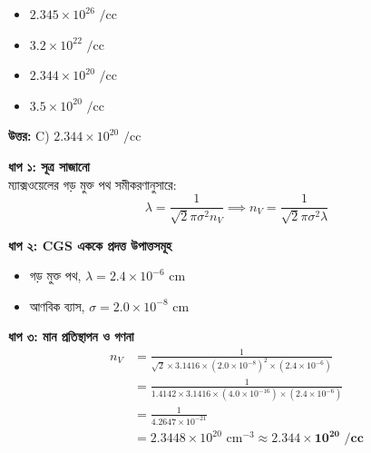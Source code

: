 \documentclass[12pt, a4paper]{article}
\begin{document}
\begin{itemize}[label={}, leftmargin=1cm, itemsep=0.5em]
    \item[\textbf{A)}] $2.345 \times 10^{26}\text{ /cc}$
    \item[\textbf{B)}] $3.2 \times 10^{22}\text{ /cc}$
    \item[\textbf{C)}] $2.344 \times 10^{20}\text{ /cc}$
    \item[\textbf{D)}] $3.5 \times 10^{20}\text{ /cc}$
\end{itemize}

\vspace{0.5em}
\begin{tcolorbox}[answerbox]
    \textbf{\color{success} উত্তর:} C) $2.344 \times 10^{20}\text{ /cc}$
\end{tcolorbox}
\vspace{1em}

\begin{tcolorbox}[solutionbox={সমাধান (Solution)}]
    \noindent
    \textbf{ধাপ ১: সূত্র সাজানো} \\
    ম্যাক্সওয়েলের গড় মুক্ত পথ সমীকরণানুসারে:
    \[ \lambda = \frac{1}{\sqrt{2} \pi \sigma^2 n_V} \implies n_V = \frac{1}{\sqrt{2} \pi \sigma^2 \lambda} \]
    
    \vspace{0.4em}
    \noindent\textbf{ধাপ ২: CGS এককে প্রদত্ত উপাত্তসমূহ}
    \begin{itemize}[leftmargin=1.5em, itemsep=0.2em]
        \item গড় মুক্ত পথ, $\lambda = 2.4 \times 10^{-6}\text{ cm}$
        \item আণবিক ব্যাস, $\sigma = 2.0 \times 10^{-8}\text{ cm}$
    \end{itemize}
    
    \vspace{0.4em}
    \noindent\textbf{ধাপ ৩: মান প্রতিস্থাপন ও গণনা}
    \begin{align*}
        n_V &= \frac{1}{\sqrt{2} \times 3.1416 \times (2.0 \times 10^{-8})^2 \times (2.4 \times 10^{-6})} \\
        &= \frac{1}{1.4142 \times 3.1416 \times (4.0 \times 10^{-16}) \times (2.4 \times 10^{-6})} \\
        &= \frac{1}{4.2647 \times 10^{-21}} \\
        &= 2.3448 \times 10^{20}\text{ cm}^{-3} \approx \mathbf{2.344 \times 10^{20}\text{ /cc}}
    \end{align*}
\end{tcolorbox}
\end{document}
